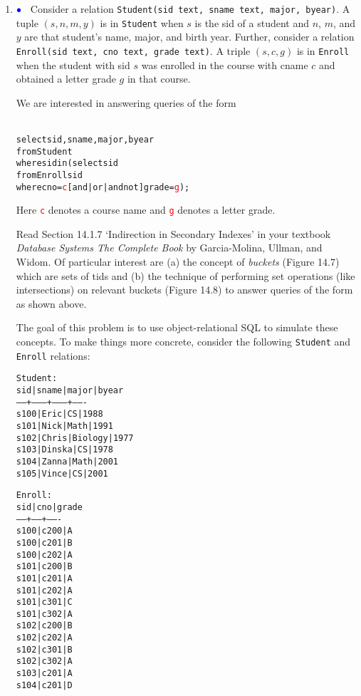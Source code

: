 \documentclass{article}
\newcommand{\bluebullet}{$\textcolor{blue}{\bullet}$}
\newcommand{\red}[1]{\textcolor{red}#1}
\newcommand{\blue}[1]{{\color{blue}#1}}
\begin{document}
\begin{enumerate}[resume] 
\item\bluebullet\ \label{secondaryIndexes}
Consider a relation {\tt Student(sid text, sname text, major, byear)}.   A tuple
$(s, n, m, y)$ is in {\tt Student} when $s$ is the sid of a student and $n$, $m$, and $y$ are that
student's name, major, and birth year.  Further,
consider a relation {\tt Enroll(sid text, cno text, grade text)}.   A triple $(s, c, g)$ is in {\tt Enroll} when the student with sid $s$ was enrolled in the course with cname $c$ and obtained a letter grade $g$ in that course. 

We are interested in answering queries of the form
{\footnotesize
\begin{alltt}{\blue{
select sid, sname, major, byear 
from   Student 
where  sid in (select sid
               from   Enroll sid
               where  cno = \red{c} [and|or|and not] grade = \red{g});}}
\end{alltt}  
}
Here \textcolor{red}{\tt c} denotes a course name and \textcolor{red}{\tt g} denotes a letter grade.

Read Section 14.1.7 `Indirection in Secondary Indexes' in your textbook \emph{Database Systems The Complete Book} by Garcia-Molina, Ullman, and Widom.   Of particular interest are (a) the concept of \emph{buckets} (Figure 14.7) which are sets of tids and (b)
the technique of performing set operations (like intersections) on relevant buckets (Figure 14.8) to answer queries of the form as shown above.

The goal of this problem is to use object-relational SQL to simulate these concepts. To make things more concrete, consider the following {\tt Student} and {\tt Enroll} relations:


\begin{center}
{\footnotesize
\begin{alltt}
Student:
 sid  | sname  |  major  | byear 
------+--------+---------+-------
 s100 | Eric   | CS      |  1988
 s101 | Nick   | Math    |  1991
 s102 | Chris  | Biology |  1977
 s103 | Dinska | CS      |  1978
 s104 | Zanna  | Math    |  2001
 s105 | Vince  | CS      |  2001
\end{alltt}
}
\end{center}
\newpage

\begin{center}
{\footnotesize
\begin{alltt}
Enroll:
 sid  | cno  | grade 
------+------+-------
 s100 | c200 | A
 s100 | c201 | B
 s100 | c202 | A
 s101 | c200 | B
 s101 | c201 | A
 s101 | c202 | A
 s101 | c301 | C
 s101 | c302 | A
 s102 | c200 | B
 s102 | c202 | A
 s102 | c301 | B
 s102 | c302 | A
 s103 | c201 | A
 s104 | c201 | D
\end{alltt}
}
\end{center}


\end{enumerate}
\end{document}
